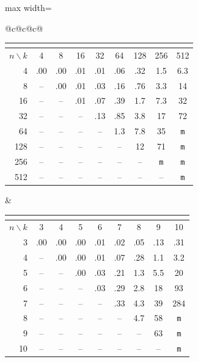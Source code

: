 \documentclass[10pt]{article}
\newcommand{\ValFunction}[1]{{\textsf{#1}}\xspace}
\newcommand{\Sup}{\ValFunction{Sup}}
\newcommand{\LimSupAvg}{\ValFunction{LimSupAvg}}
\newcommand{\SumPlus}{\ValFunction{Sum$^+$}}
\newcommand{\oom}{\texttt{m}}
\begin{document}
\begin{table}[t]
	\centering
	\begin{adjustbox}{max width=\linewidth}
		\scriptsize
		\setlength{\tabcolsep}{2pt}
		\renewcommand{\arraystretch}{1.05}
		\begin{tabular}{@{}c@{\qquad}c@{\qquad}c@{}}
			\begin{tabular}[t]{@{}r*{8}{c}@{}}
				\multicolumn{9}{c}{\makebox[0pt]{(a) (\Sup,\SumPlus) emptiness}}\\[2pt]
				\toprule
				$n\backslash k$ & 4 & 8 & 16 & 32 & 64 & 128 & 256 & 512 \\
				\midrule
				4 & .00 & .00 & .01 & .01 & .06 & .32 & 1.5 & 6.3 \\
				8 & -- & .00 & .01 & .03 & .16 & .76 & 3.3 & 14 \\
				16 & -- & -- & .01 & .07 & .39 & 1.7 & 7.3 & 32 \\
				32 & -- & -- & -- & .13 & .85 & 3.8 & 17 & 72 \\
				64 & -- & -- & -- & -- & 1.3 & 7.8 & 35 & \oom \\
				128 & -- & -- & -- & -- & -- & 12 & 71 & \oom \\
				256 & -- & -- & -- & -- & -- & -- & \oom & \oom \\
				512 & -- & -- & -- & -- & -- & -- & -- & \oom \\
				\bottomrule
			\end{tabular}
			&
			\begin{tabular}[t]{@{}r*{8}{c}@{}}
				\multicolumn{9}{c}{\makebox[0pt]{(b) (\LimSupAvg,\SumPlus) emptiness}}\\[2pt]
				\toprule
				$n\backslash k$ & 3 & 4 & 5 & 6 & 7 & 8 & 9 & 10 \\
				\midrule
				3 & .00 & .00 & .00 & .01 & .02 & .05 & .13 & .31 \\
				4 & -- & .00 & .00 & .01 & .07 & .28 & 1.1 & 3.2 \\
				5 & -- & -- & .00 & .03 & .21 & 1.3 & 5.5 & 20 \\
				6 & -- & -- & -- & .03 & .29 & 2.8 & 18 & 93 \\
				7 & -- & -- & -- & -- & .33 & 4.3 & 39 & 284 \\
				8 & -- & -- & -- & -- & -- & 4.7 & 58 & \oom \\
				9 & -- & -- & -- & -- & -- & -- & 63 & \oom \\
				10 & -- & -- & -- & -- & -- & -- & -- & \oom \\
				\bottomrule
			\end{tabular}

\end{tabular}
\end{adjustbox}
\end{table}
\end{document}
